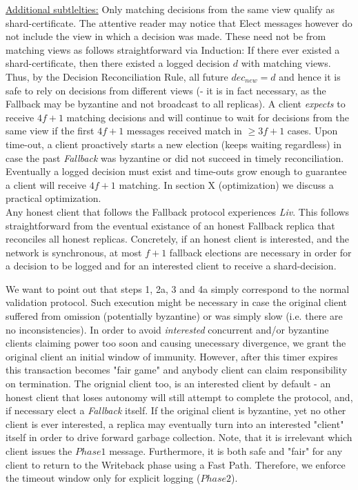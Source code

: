 \underline{Additional subtlelties:} Only matching decisions from the same view qualify as shard-certificate. The attentive reader may notice that Elect messages however do not include the view in which a decision was made. These need not be from matching views as follows straightforward via Induction: If there ever existed a shard-certificate, then there existed a logged decision $d$ with matching views. Thus, by the Decision Reconciliation Rule, all future $dec_{new} = d$ and hence it is safe to rely on decisions from different views (- it is in fact necessary, as the Fallback may be byzantine and not broadcast to all replicas).
A client \textit{expects} to receive $4f+1$ matching decisions and will continue to wait for decisions from the same view if the first $4f+1$ messages received match in $\geq 3f+1$ cases. Upon time-out, a client proactively starts a new election (keeps waiting regardless) in case the past \textit{Fallback} was byzantine or did not succeed in timely reconciliation. Eventually a logged decision must exist and time-outs grow enough to guarantee a client will receive $4f+1$ matching. In section X (optimization) we discuss a practical optimization.
 \\


Any honest client that follows the Fallback protocol experiences \textit{Liv}. This follows straightforward from the eventual existance of an honest Fallback replica that reconciles all honest replicas. Concretely, if an honest client is interested, and the network is synchronous, at most $f+1$ fallback elections are necessary in order for a decision to be logged and for an interested client to receive a shard-decision.


We want to point out that steps 1, 2a, 3 and 4a simply correspond to the normal validation protocol. Such execution might be necessary in case the original client suffered from omission (potentially byzantine) or was simply slow (i.e. there are no inconsistencies). In order to avoid \textit{interested} concurrent and/or byzantine clients claiming power too soon and causing unecessary divergence, we grant the original client an initial window of immunity.
However, after this timer expires this transaction becomes "fair game" and anybody client can claim responsibility on termination. The orignial client too, is an interested client by default - an honest client that loses autonomy will still attempt to complete the protocol, and, if necessary elect a \textit{Fallback} itself. If the original client is byzantine, yet no other client is ever interested, a replica may eventually turn into an interested "client" itself in order to drive forward garbage collection.
Note, that it is irrelevant which client issues the $Phase1$ message. Furthermore, it is both safe and "fair" for any client to return to the Writeback phase using a Fast Path. Therefore, we enforce the timeout window only for explicit logging ($Phase2$). 

